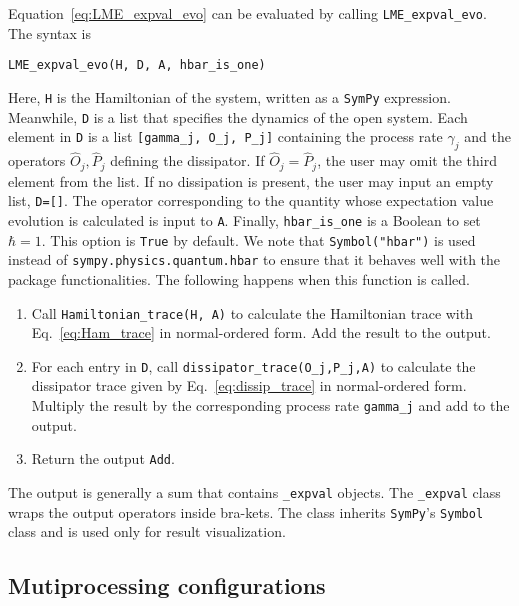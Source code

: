\documentclass[5p, twocolumn, 10pt, sort&compress]{elsarticle}
\newcommand{\inlinecode}[1]{\texttt{#1}}
\begin{document}
Equation~\eqref{eq:LME_expval_evo} can be evaluated by calling \inlinecode{LME_expval_evo}. The syntax is
\begin{verbatim}
LME_expval_evo(H, D, A, hbar_is_one)
\end{verbatim}
Here, \inlinecode{H} is the Hamiltonian of the system, written as a \texttt{SymPy} expression. Meanwhile, \inlinecode{D} is a list that specifies the dynamics of the open system.  Each element in \inlinecode{D} is a list \inlinecode{[gamma_j, O_j, P_j]} containing the process rate $\gamma_j$ and the operators $\hat{O}_j,\hat{P}_j$ defining the dissipator. If $\hat{O}_j=\hat{P}_j$, the user may omit the third element from the list. If no dissipation is present, the user may input an empty list, \inlinecode{D=[]}. The operator corresponding to the quantity whose expectation value evolution is calculated is input to \inlinecode{A}. Finally, \inlinecode{hbar_is_one} is a Boolean to set $\hbar=1$. This option is \inlinecode{True} by default. We note that \inlinecode{Symbol("hbar")} is used instead of \inlinecode{sympy.physics.quantum.hbar} to ensure that it behaves well with the package functionalities. The following happens when this function is called.
\begin{enumerate}
    \item Call \inlinecode{Hamiltonian_trace(H, A)} to calculate the Hamiltonian trace with Eq.~\eqref{eq:Ham_trace} in normal-ordered form. Add the result to the output.
    \item For each entry in \inlinecode{D}, call \inlinecode{dissipator_trace(O_j,P_j,A)} to calculate the dissipator trace given by Eq.~\eqref{eq:dissip_trace} in normal-ordered form. Multiply the result by the corresponding process rate \inlinecode{gamma_j} and add to the output.
    \item Return the output \inlinecode{Add}. 
\end{enumerate}
The output is generally a sum that contains \inlinecode{_expval} objects. The \inlinecode{_expval} class wraps the output operators inside bra-kets. The class inherits \texttt{SymPy}'s \inlinecode{Symbol} class and is used only for result visualization. 


\subsection{Mutiprocessing configurations}
\end{document}
